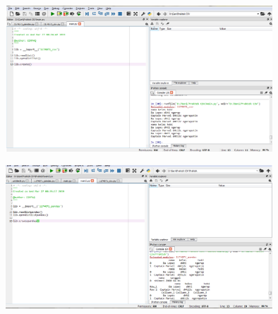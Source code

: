 \begin{figure}[ht]
	\includegraphics[width=10cm]{figures/4/1174071/Praktek/1174071_main8.png}
	\centering
\end{figure}
\begin{figure}[ht]
	\includegraphics[width=10cm]{figures/4/1174071/Praktek/1174071_main9.png}
	\centering
\end{figure}



